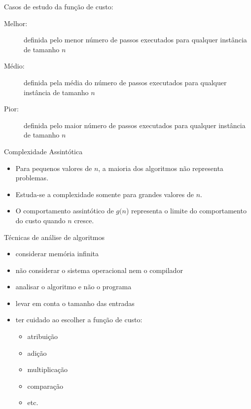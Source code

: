 \begin{frame}[label=main]
	Casos de estudo da função de custo:
	\begin{description}
		\item[Melhor:] definida pelo menor número de passos executados 
		para qualquer instância de tamanho $n$
		\item[Médio:] definida pela média do número de passos executados 
		para qualquer instância de tamanho $n$
		\item[Pior:] definida pelo maior número de passos executados para 
		qualquer instância de tamanho $n$
	\end{description}
	\pause\vfill
	\begin{block}{Complexidade Assintótica}
		\begin{itemize}
			\item Para pequenos valores de $n$, a maioria dos algoritmos não representa problemas.
			\item Estuda-se a complexidade somente para \alert<2>{grandes valores de $n$}.
			\item O comportamento assintótico de $g(n$) representa o limite do 
			comportamento do custo quando $n$ cresce.
		\end{itemize}
	\end{block}
\end{frame}

\begin{frame}[label=main]
	Técnicas de análise de algoritmos
		\begin{itemize}
			\item considerar memória infinita
			\item não considerar o sistema operacional nem o compilador
			\item analisar o algoritmo e não o programa
			\item levar em conta o tamanho das entradas
			\item ter cuidado ao escolher a função de custo:
				\begin{itemize}
					\item atribuição
					\item adição
					\item multiplicação
					\item comparação
					\item etc.
				\end{itemize}
		\end{itemize}
\end{frame}


